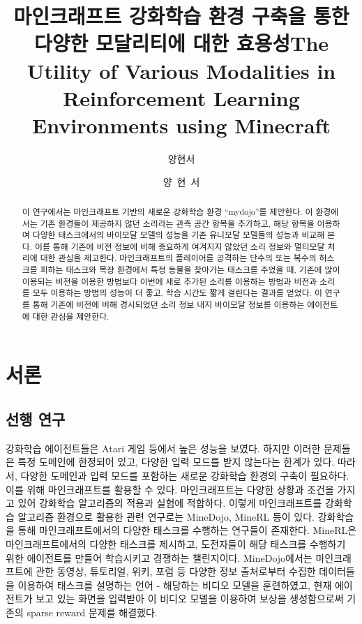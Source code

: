 \documentclass[oneside, under, ko]{snuthesis}
\title{마인크래프트 강화학습 환경 구축을 통한 다양한 모달리티에 대한 효용성}
\title*{The Utility of Various Modalities in Reinforcement Learning Environments using Minecraft}
\author{양현서}
\author*{양~현~서} %
\begin{document}
\makefrontcover

\cleardoublepage

\renewcommand{\abstractname}{국문초록}
\begin{abstract}
	이 연구에서는 마인크래프트 기반의 새로운 강화학습 환경 “mydojo”를 제안한다. 이 환경에서는 기존 환경들이 제공하지 않던 소리라는 관측 공간 항목을 추가하고, 해당 항목을 이용하여 다양한 태스크에서의 바이모달 모델의 성능을 기존 유니모달 모델들의 성능과 비교해 본다. 이를 통해 기존에 비전 정보에 비해 중요하게 여겨지지 않았던 소리 정보와 멀티모달 처리에 대한 관심을 제고한다. 마인크래프트의 플레이어를 공격하는 단수의 또는 복수의 허스크를 피하는 태스크와 목장 환경에서 특정 동물을 찾아가는 태스크를 주었을 때, 기존에 많이 이용되는 비전을 이용한 방법보다 이번에 새로 추가된 소리를 이용하는 방법과 비전과 소리를 모두 이용하는 방법의 성능이 더 좋고, 학습 시간도 짧게 걸린다는 결과를 얻었다. 이 연구를 통해 기존에 비전에 비해 경시되었던 소리 정보 내지 바이모달 정보를 이용하는 에이전트에 대한 관심을 제안한다.
\end{abstract}

\tableofcontents

\cleardoublepage

\chapter{서론}

\section{선행 연구}
강화학습 에이전트들은 Atari 게임 등에서 높은 성능을 보였다. 하지만 이러한 문제들은 특정 도메인에 한정되어 있고, 다양한 입력 모드를 받지 않는다는 한계가 있다. 따라서, 다양한 도메인과 입력 모드를 포함하는 새로운 강화학습 환경의 구축이 필요하다. 이를 위해 마인크래프트를 활용할 수 있다. 마인크래프트는 다양한 상황과 조건을 가지고 있어 강화학습 알고리즘의 적용과 실험에 적합하다. 이렇게 마인크래프트를 강화학습 알고리즘 환경으로 활용한 관련 연구로는 MineDojo, MineRL 등이 있다. 강화학습을 통해 마인크래프트에서의 다양한 태스크를 수행하는 연구들이 존재한다. MineRL은 마인크래프트에서의 다양한 태스크를 제시하고, 도전자들이 해당 태스크를 수행하기 위한 에이전트를 만들어 학습시키고 경쟁하는 챌린지이다. \cite{minerl} MineDojo에서는 마인크래프트에 관한 동영상, 튜토리얼, 위키, 포럼 등 다양한 정보 출처로부터 수집한 데이터들을 이용하여 태스크를 설명하는 언어 - 해당하는 비디오 모델을 훈련하였고, 현재 에이전트가 보고 있는 화면을 입력받아 이 비디오 모델을 이용하여 보상을 생성함으로써 기존의 sparse reward 문제를 해결했다. \cite{minedojo}
\end{document}
